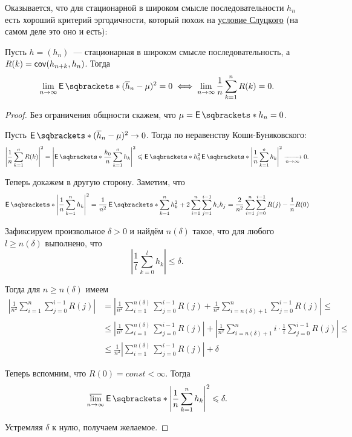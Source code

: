 Оказывается, что для стационарной в широком смысле последовательности \(h_{n}\) 
есть хороший критерий эргодичности, который похож на 
\hyperref[slutsky-criterion]{условие Слуцкого} (на самом деле это оно и есть):
\begin{theorem}
	Пусть \(h = (h_{n})\)~--- стационарная в широком смысле последовательность, 
	а \(R(k) = \operatorname{\mathsf{cov}}(h_{n + k}, h_{n})\). Тогда
	\[
		\lim\limits_{n \to \infty} \E{(\overline{h}_{n} - \mu)^{2}} = 0 \iff 
		\lim\limits_{n \to \infty} \frac{1}{n}\sum_{k = 1}^{n} R(k) = 0.
	\]
\end{theorem}
\begin{proof}
	Без ограничения общности скажем, что \(\mu = \E{h_{n}} = 0\).
	
	Пусть \(\E{(\overline{h}_{n} - \mu)^{2}} \to 0\). Тогда по неравенству 
	Коши-Буняковского:
	\[
		\left|\frac{1}{n}\sum_{k = 1}^{n} R(k)\right|^{2} = 
		\left|\E{\frac{h_{0}}{n}\sum_{k = 1}^{n}h_{k}}\right|^{2} \leq 
		\E{h_{0}^{2}}\E{\left|\frac{1}{n}\sum_{k = 1}^{n}h_{k}\right|^{2}} 
		\xrightarrow[n \to \infty]{} 0.
	\]
	
	Теперь докажем в другую сторону. Заметим, что
	\[
		\E{\left|\frac{1}{n}\sum_{k = 1}^{n}h_{k}\right|^{2}} = 
		\frac{1}{n^{2}}\E{\sum_{k = 1}^{n} h_{k}^{2} + 2\sum_{i = 1}^{n}\sum_{j 
		= 1}^{i -1} h_{i}h_{j}} = \frac{2}{n^{2}}\sum_{i = 1}^{n}\sum_{j = 
		0}^{i - 1} R(j) - \frac{1}{n}R(0)
	\]
	
	Зафиксируем произвольное \(\delta > 0\) и найдём \(n(\delta)\) такое, что 
	для любого \(l \geq n(\delta)\) выполнено, что
	\[
		\left|\frac{1}{l}\sum_{k = 0}^{l}h_{k}\right| \leq \delta.
	\]
	
	Тогда для \(n \geq n(\delta)\) имеем
	\begin{align*}
		\left|\frac{1}{n^{2}}\sum_{i = 1}^{n}\sum_{j = 0}^{i - 1} R(j)\right| 
		&= \left|\frac{1}{n^{2}}\sum_{i = 1}^{n(\delta)}\sum_{j = 0}^{i - 1} 
		R(j) + \frac{1}{n^{2}}\sum_{i = n(\delta) + 1}^{n}\sum_{j = 0}^{i - 1} 
		R(j)\right| \leq \\
		&\leq \left|\frac{1}{n^{2}}\sum_{i = 1}^{n(\delta)}\sum_{j = 0}^{i - 1} 
		R(j)\right| + \left|\frac{1}{n^{2}}\sum_{i = n(\delta) + 1}^{n}i\cdot 
		\frac{1}{i}\sum_{j = 0}^{i - 1} R(j)\right| \leq \\
		&\leq \frac{1}{n^{2}}\left|\sum_{i = 1}^{n(\delta)}\sum_{j = 0}^{i - 1} 
		R(j)\right| + \delta
	\end{align*}
	
	Теперь вспомним, что \(R(0) = const < \infty\). Тогда
	\[
		\varlimsup\limits_{n \to \infty} \E{\left|\frac{1}{n}\sum_{k = 
		1}^{n}h_{k}\right|^{2}} \leq \delta.
	\]
	
	Устремляя \(\delta\) к нулю, получаем желаемое.
\end{proof}

